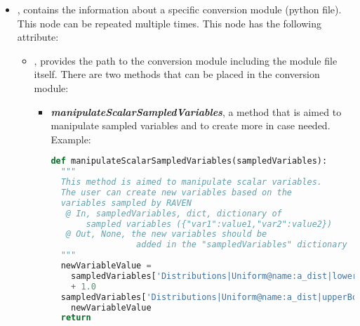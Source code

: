 \begin{itemize}
\begin{itemize}
      \item {},  contains the information about a specific
        conversion module (python file).  This node can be repeated multiple times.
        This node has the following attribute:
        \begin{itemize} %
          \item {},  provides the path to the conversion module including
              the module file itself.  There are two methods that can be placed in the conversion module:
              \begin{itemize} %
                 \item \textbf{\textit{manipulateScalarSampledVariables}}, a method that is aimed to manipulate sampled variables and to create more in case needed.
                 Example:
                  \begin{lstlisting}[language=python]
def manipulateScalarSampledVariables(sampledVariables):
  """
  This method is aimed to manipulate scalar variables.
  The user can create new variables based on the
  variables sampled by RAVEN
   @ In, sampledVariables, dict, dictionary of
       sampled variables ({"var1":value1,"var2":value2})
   @ Out, None, the new variables should be
                 added in the "sampledVariables" dictionary
  """
  newVariableValue =
    sampledVariables['Distributions|Uniform@name:a_dist|lowerBound']
    + 1.0
  sampledVariables['Distributions|Uniform@name:a_dist|upperBound'] =
    newVariableValue
  return
                   \end{lstlisting}


\end{itemize}
\end{itemize}
\end{itemize}
\end{itemize}

